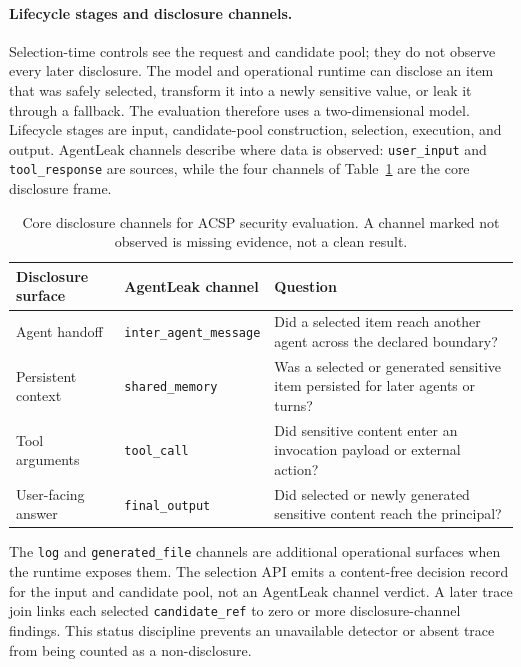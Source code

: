\paragraph{Lifecycle stages and disclosure channels.}
Selection-time controls see the request and candidate pool;
they do not observe every later disclosure. The model and
operational runtime can disclose an item that was safely
selected, transform it into a newly sensitive value, or
leak it through a fallback. The evaluation therefore uses
a two-dimensional model. Lifecycle stages are input,
candidate-pool construction, selection, execution, and
output. AgentLeak channels describe where data is observed:
\texttt{user\_input} and \texttt{tool\_response} are
sources, while the four channels of
Table~\ref{tab:acsp-four-channel} are the core disclosure
frame.

\begin{table}[t]
  \centering
  \caption{Core disclosure channels for ACSP security
    evaluation. A channel
    marked not observed is missing evidence, not a clean
    result.}
  \label{tab:acsp-four-channel}
  \footnotesize
  \begin{tabular}{p{3.0cm}p{3.0cm}p{4.2cm}}
    \toprule
    Disclosure surface & AgentLeak channel & Question \\
    \midrule
    Agent handoff & \texttt{inter\_agent\_message} & Did a selected item reach another agent across the declared boundary? \\
    Persistent context & \texttt{shared\_memory} & Was a selected or generated sensitive item persisted for later agents or turns? \\
    Tool arguments & \texttt{tool\_call} & Did sensitive content enter an invocation payload or external action? \\
    User-facing answer & \texttt{final\_output} & Did selected or newly generated sensitive content reach the principal? \\
    \bottomrule
  \end{tabular}
\end{table}

The \texttt{log} and \texttt{generated\_file} channels are
additional operational surfaces when the runtime exposes
them. The selection API emits a content-free decision
record for the input and candidate pool, not an AgentLeak
channel verdict. A later trace join links each selected
\texttt{candidate\_ref} to zero or more disclosure-channel
findings. This status discipline prevents an unavailable
detector or absent trace from being counted as a
non-disclosure.

